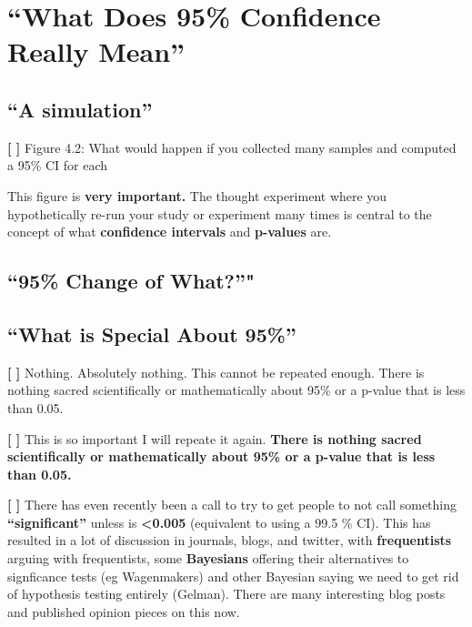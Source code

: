 \documentclass[]{book}
\theoremstyle{definition}
\theoremstyle{definition}
\theoremstyle{definition}
\theoremstyle{remark}
\begin{document}
\section{\texorpdfstring{``What Does 95\% Confidence Really
Mean''}{What Does 95\% Confidence Really Mean}}\label{what-does-95-confidence-really-mean}

\subsection{\texorpdfstring{``A
simulation''}{A simulation}}\label{a-simulation}

\textbf{{[} {]}} Figure 4.2: What would happen if you collected many
samples and computed a 95\% CI for each

This figure is \textbf{very important.} The thought experiment where you
hypothetically re-run your study or experiment many times is central to
the concept of what \textbf{confidence intervals} and \textbf{p-values}
are.

\subsection{\texorpdfstring{``95\% Change of
What?''"}{95\% Change of What?"}}\label{change-of-what}

\subsection{\texorpdfstring{``What is Special About
95\%''}{What is Special About 95\%}}\label{what-is-special-about-95}

\textbf{{[} {]}} Nothing. Absolutely nothing. This cannot be repeated
enough. There is nothing sacred scientifically or mathematically about
95\% or a p-value that is less than 0.05.

\textbf{{[} {]}} This is so important I will repeate it again.
\textbf{There is nothing sacred scientifically or mathematically about
95\% or a p-value that is less than 0.05.}

\textbf{{[} {]}} There has even recently been a call to try to get
people to not call something \textbf{``significant''} unless is
\textbf{\textless{}0.005} (equivalent to using a 99.5 \% CI). This has
resulted in a lot of discussion in journals, blogs, and twitter, with
\textbf{frequentists} arguing with frequentists, some \textbf{Bayesians}
offering their alternatives to signficance tests (eg Wagenmakers) and
other Bayesian saying we need to get rid of hypothesis testing entirely
(Gelman). There are many interesting blog posts and published opinion
pieces on this now.
\end{document}
